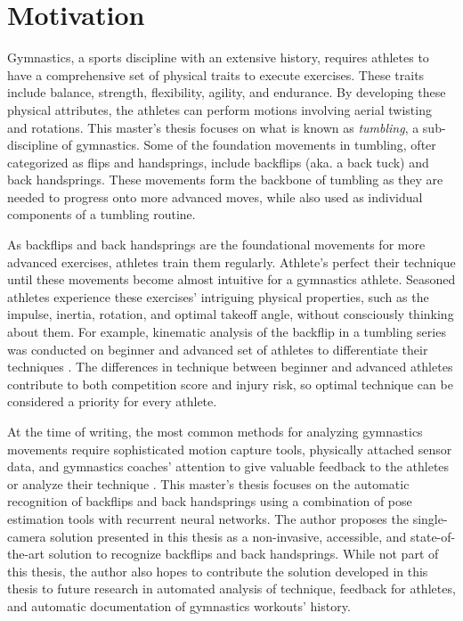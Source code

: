 \section{Motivation}

Gymnastics, a sports discipline with an extensive history, requires athletes to have a comprehensive set of physical traits to execute exercises. These traits include balance, strength, flexibility, agility, and endurance. By developing these physical attributes, the athletes can perform motions involving aerial twisting and rotations. This master's thesis focuses on what is known as \textit{tumbling}, a sub-discipline of gymnastics. Some of the foundation movements in tumbling, ofter categorized as flips and handsprings, include backflips (aka. a back tuck) and back handsprings. These movements form the backbone of tumbling as they are needed to progress onto more advanced moves, while also used as individual components of a tumbling routine.

As backflips and back handsprings are the foundational movements for more advanced exercises, athletes train them regularly. Athlete's perfect their technique until these movements become almost intuitive for a gymnastics athlete. Seasoned athletes experience these exercises' intriguing physical properties, such as the impulse, inertia, rotation, and optimal takeoff angle, without consciously thinking about them. For example, kinematic analysis of the backflip in a tumbling series was conducted on beginner and advanced set of athletes to differentiate their techniques \cite{Burgess2001KINEMATICAO}. The differences in technique between beginner and advanced athletes contribute to both competition score and injury risk, so optimal technique can be considered a priority for every athlete.

At the time of writing, the most common methods for analyzing gymnastics movements require sophisticated motion capture tools, physically attached sensor data, and gymnastics coaches' attention to give valuable feedback to the athletes or analyze their technique \cite{park2014kinematic} \cite{yamada2019dynamics}. This master's thesis focuses on the automatic recognition of backflips and back handsprings using a combination of pose estimation tools with recurrent neural networks. The author proposes the single-camera solution presented in this thesis as a non-invasive, accessible, and state-of-the-art solution to recognize backflips and back handsprings. While not part of this thesis, the author also hopes to contribute the solution developed in this thesis to future research in automated analysis of technique, feedback for athletes, and automatic documentation of gymnastics workouts' history.

